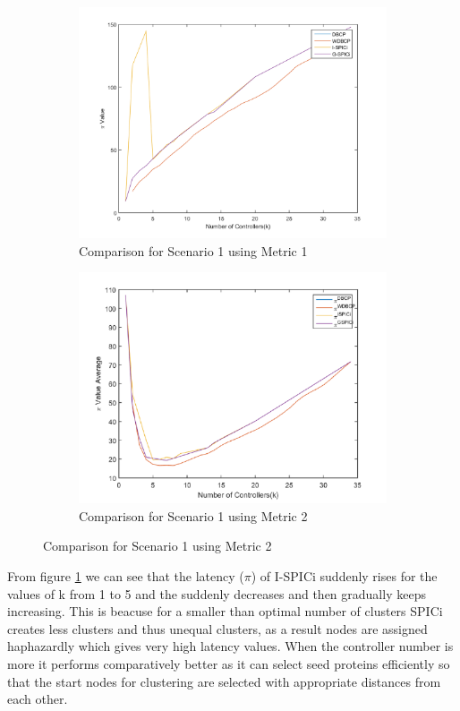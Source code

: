 \documentclass[10pt]{extarticle}
\begin{document}
	\begin{figure}
		\begin{subfigure}{0.5\linewidth}
			\includegraphics[width=\linewidth]{comparison_1.png}
			\caption{Comparison for Scenario 1 using Metric 1}
			\label{fig:comp1}
		\end{subfigure}
		\begin{subfigure}{0.5\linewidth}
			\includegraphics[width=\linewidth]{our_comp_1.png}
			\caption{Comparison for Scenario 1 using Metric 2}
			\label{fig:ourcomp1}
		\end{subfigure}
	\end{figure}
	From figure \ref{fig:comp1} we can see that the latency ($\pi$) of I-SPICi suddenly rises for the values of k from 1 to 5 and the suddenly decreases and then gradually keeps increasing. This is beacuse for a smaller than optimal number of clusters SPICi creates less clusters and thus unequal clusters, as a result nodes are assigned haphazardly which gives very high latency values. When the controller number is more it performs comparatively better as it can select seed proteins efficiently so that the start nodes for clustering are selected with appropriate distances from each other.
	
\end{document}
